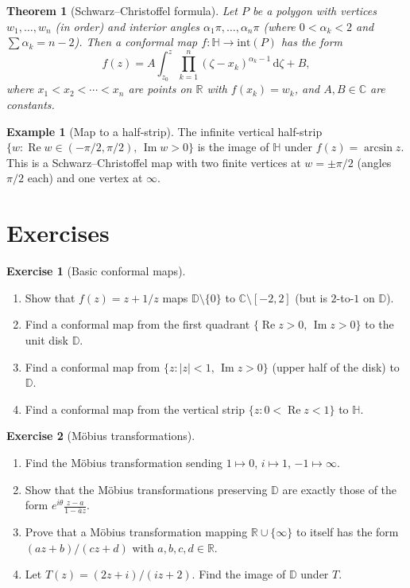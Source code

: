 \documentclass[12pt,a4paper,openany]{book}
\theoremstyle{definition}
\newtheorem{example}[definition]{Example}
\newtheorem{exercise}{Exercise}[chapter]
\theoremstyle{plain}
\newtheorem{theorem}[definition]{Theorem}
\theoremstyle{remark}
\newcommand{\C}{\mathbb{C}}
\newcommand{\R}{\mathbb{R}}
\newcommand{\D}{\mathbb{D}}
\DeclareMathOperator{\re}{Re}
\DeclareMathOperator{\im}{Im}
\newcommand{\dd}{\mathrm{d}}
\newcommand{\abs}[1]{\left|#1\right|}
\newcommand{\conj}[1]{\overline{#1}}
\begin{document}
\begin{theorem}[Schwarz--Christoffel formula]\label{thm:schwarz-christoffel}
Let $P$ be a polygon with vertices $w_1,\dots,w_n$ (in order)
and interior angles $\alpha_1\pi,\dots,\alpha_n\pi$ (where
$0<\alpha_k<2$ and $\sum\alpha_k=n-2$).  Then a conformal map
$f\colon\mathbb{H}\to\mathrm{int}(P)$ has the form
\[
  f(z)=A\int_{z_0}^{z}\prod_{k=1}^{n}(\zeta-x_k)^{\alpha_k-1}\,
  \dd\zeta+B,
\]
where $x_1<x_2<\cdots<x_n$ are points on $\R$ with $f(x_k)=w_k$,
and $A,B\in\C$ are constants.
\end{theorem}

\begin{example}[Map to a half-strip]\label{ex:sc-half-strip}
The infinite vertical half-strip
$\{w:\re w\in(-\pi/2,\pi/2),\,\im w>0\}$ is the image of
$\mathbb{H}$ under $f(z)=\arcsin z$.  This is a Schwarz--Christoffel
map with two finite vertices at $w=\pm\pi/2$ (angles $\pi/2$ each)
and one vertex at $\infty$.
\end{example}

\section{Exercises}\label{sec:ex-ch8}

\begin{exercise}[Basic conformal maps]\label{exer:basic-conformal}
\begin{enumerate}[label=(\alph*)]
  \item Show that $f(z)=z+1/z$ maps $\D\setminus\{0\}$ to
        $\C\setminus[-2,2]$ (but is $2$-to-$1$ on $\D$).
  \item Find a conformal map from the first quadrant
        $\{\re z>0,\,\im z>0\}$ to the unit disk $\D$.
  \item Find a conformal map from $\{z:\abs{z}<1,\,\im z>0\}$
        (upper half of the disk) to $\D$.
  \item Find a conformal map from the vertical strip
        $\{z:0<\re z<1\}$ to $\mathbb{H}$.
\end{enumerate}
\end{exercise}

\begin{exercise}[M\"obius transformations]\label{exer:mobius}
\begin{enumerate}[label=(\alph*)]
  \item Find the M\"obius transformation sending
        $1\mapsto 0$, $i\mapsto 1$, $-1\mapsto\infty$.
  \item Show that the M\"obius transformations preserving $\D$ are
        exactly those of the form $e^{i\theta}\frac{z-a}{1-\conj{a}z}$.
  \item Prove that a M\"obius transformation mapping $\R\cup\{\infty\}$
        to itself has the form $(az+b)/(cz+d)$ with $a,b,c,d\in\R$.
  \item Let $T(z)=(2z+i)/(iz+2)$.  Find the image of $\D$ under $T$.
\end{enumerate}
\end{exercise}
\end{document}
